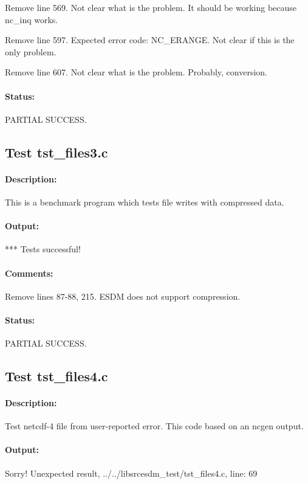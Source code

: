 Remove line 569. Not clear what is the problem. It should be working because nc\_inq works.

Remove line 597. Expected error code: NC\_ERANGE. Not clear if this is the only problem.

Remove line 607. Not clear what is the problem. Probably, conversion.

\paragraph{Status:} PARTIAL SUCCESS.

\subsection{Test tst\_files3.c}

\paragraph{Description:} This is a benchmark program which tests file writes with compressed data.

\paragraph{Output:} *** Tests successful!

\paragraph{Comments:} Remove lines 87-88, 215. ESDM does not support compression.

\paragraph{Status:} PARTIAL SUCCESS.

\subsection{Test tst\_files4.c}

\paragraph{Description:} Test netcdf-4 file from user-reported error. This code based on an ncgen output.

\paragraph{Output:} Sorry! Unexpected result, ../../libsrcesdm\_test/tst\_files4.c, line: 69

